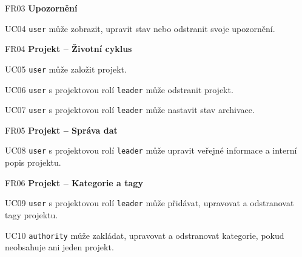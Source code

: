 \begin{dlnar}
   \item[FR03] \textbf{Upozornění}
 
   \begin{dlnar}
      \item[UC04] 
      \texttt{user} může zobrazit, upravit stav nebo odstranit svoje upozornění.
   \end{dlnar}
\end{dlnar}


\begin{dlnar}
   \item[FR04] \textbf{Projekt -- Životní cyklus}
   
   \begin{dlnar}
      \item[UC05]
      \texttt{user} může založit projekt. 

      \item[UC06]
      \texttt{user} s projektovou rolí \texttt{leader} může odstranit projekt. 

      \item[UC07]
      \texttt{user} s projektovou rolí \texttt{leader} může nastavit stav archivace.
   \end{dlnar}
\end{dlnar}


\begin{dlnar}
   \item[FR05] \textbf{Projekt -- Správa dat}
   
   \begin{dlnar}
      \item[UC08]
      \texttt{user} s projektovou rolí \texttt{leader} může upravit veřejné informace a interní popis projektu.
   \end{dlnar}
\end{dlnar}


\begin{dlnar}
   \item[FR06] \textbf{Projekt -- Kategorie a tagy}
 
   \begin{dlnar}
      \item[UC09]
      \texttt{user} s projektovou rolí \texttt{leader} může přidávat, upravovat a odstranovat tagy projektu. 

      \item[UC10]
      \texttt{authority} může zakládat, upravovat a odstranovat kategorie, pokud neobsahuje ani jeden projekt. 
   \end{dlnar}
\end{dlnar}


